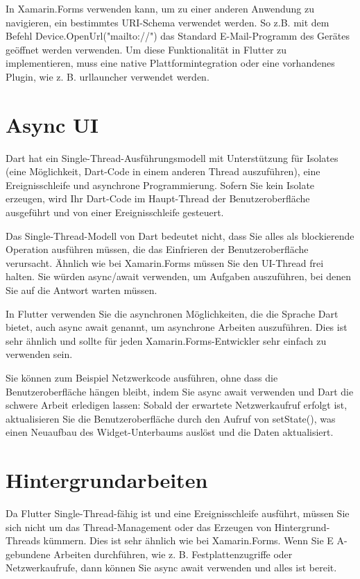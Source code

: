 In Xamarin.Forms verwenden kann, um zu einer anderen Anwendung zu navigieren, ein bestimmtes URI-Schema verwendet werden.  So z.B. mit dem Befehl Device.OpenUrl("mailto://") das Standard E-Mail-Programm des Gerätes geöffnet werden verwenden.
Um diese Funktionalität in Flutter zu implementieren,  muss eine native Plattformintegration oder eine vorhandenes Plugin, wie z. B. urllauncher verwendet werden.  
\section{Async UI}
Dart hat ein Single-Thread-Ausführungsmodell mit Unterstützung für Isolates (eine Möglichkeit, Dart-Code in einem anderen Thread auszuführen), eine Ereignisschleife und asynchrone Programmierung. Sofern Sie kein Isolate erzeugen, wird Ihr Dart-Code im Haupt-Thread der Benutzeroberfläche ausgeführt und von einer Ereignisschleife gesteuert.

Das Single-Thread-Modell von Dart bedeutet nicht, dass Sie alles als blockierende Operation ausführen müssen, die das Einfrieren der Benutzeroberfläche verursacht. Ähnlich wie bei Xamarin.Forms müssen Sie den UI-Thread frei halten. Sie würden async/await verwenden, um Aufgaben auszuführen, bei denen Sie auf die Antwort warten müssen.

In Flutter verwenden Sie die asynchronen Möglichkeiten, die die Sprache Dart bietet, auch async await genannt, um asynchrone Arbeiten auszuführen. Dies ist \Csharp sehr ähnlich und sollte für jeden Xamarin.Forms-Entwickler sehr einfach zu verwenden sein.

Sie können zum Beispiel Netzwerkcode ausführen, ohne dass die Benutzeroberfläche hängen bleibt, indem Sie async await verwenden und Dart die schwere Arbeit erledigen lassen:
Sobald der erwartete Netzwerkaufruf erfolgt ist, aktualisieren Sie die Benutzeroberfläche durch den Aufruf von setState(), was einen Neuaufbau des Widget-Unterbaums auslöst und die Daten aktualisiert.
\section{Hintergrundarbeiten}
Da Flutter Single-Thread-fähig ist und eine Ereignisschleife ausführt, müssen Sie sich nicht um das Thread-Management oder das Erzeugen von Hintergrund-Threads kümmern. Dies ist sehr ähnlich wie bei Xamarin.Forms. Wenn Sie E A-gebundene Arbeiten durchführen, wie z. B. Festplattenzugriffe oder Netzwerkaufrufe, dann können Sie async await verwenden und alles ist bereit.

